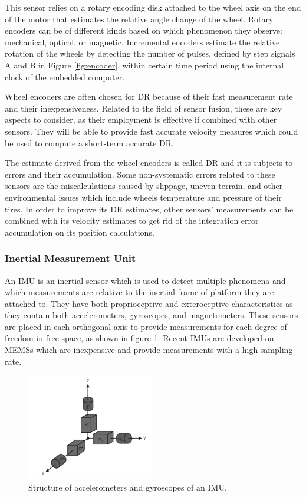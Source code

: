 This sensor relies on a rotary encoding disk attached to the wheel axis on the end of the motor that estimates the relative angle change of the wheel. 
Rotary encoders can be of different kinds based on which phenomenon they observe: mechanical, optical, or magnetic.
Incremental encoders estimate the relative rotation of the wheels by detecting the number of pulses, defined by step signals A and B in Figure \ref{fig:encoder}, within certain time period using the internal clock of the embedded computer.

Wheel encoders are often chosen for \gls{DR} because of their fast measurement rate and their inexpensiveness. 
Related to the field of sensor fusion, these are key aspects to consider, as their employment is effective if combined with other sensors. They will be able to provide fast accurate velocity measures which could be used to compute a short-term accurate \gls{DR}.

The estimate derived from the wheel encoders is called \gls{DR} and it is subjects to errors and their accumulation.
Some non-systematic errors related to these sensors are the miscalculations caused by slippage, uneven terrain, and other environmental issues which include wheels temperature and pressure of their tires.
In order to improve its \gls{DR} estimates, other sensors' measurements can be combined with its velocity estimates to get rid of the integration error accumulation on its position calculations.
    
    
\subsubsection{Inertial Measurement Unit}

\noindent An \gls{IMU} is an inertial sensor which is used to detect multiple phenomena and which measurements are relative to the inertial frame of platform they are attached to.
They have both proprioceptive and exteroceptive characteristics as they contain both accelerometers, gyroscopes, and magnetometers.
These sensors are placed in each orthogonal axis to provide measurements for each degree of freedom in free space, as shown in figure \ref{fig:imu}.
Recent \glspl{IMU} are developed on \glspl{MEMS} which are inexpensive and provide measurements with a high sampling rate.
\begin{figure}[!ht]
  \begin{center}
    \includegraphics[width=0.5\textwidth]{Images/2-Background/IMU-2021-04-23 14-13-19.png}
  \end{center}
  \caption{Structure of accelerometers and gyroscopes of an \Gls{IMU}. \cite{inertial}}
  \label{fig:imu}
\end{figure}


